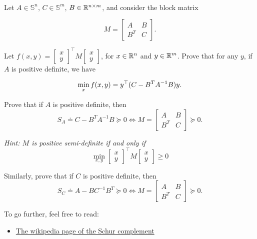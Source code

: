 \\ 
 Let $A \in \mathbb{S}^{n}$, $C \in \mathbb{S}^{m}$, $B \in \mathbb{R}^{n\times m}$, and consider the block matrix
 
 \[
 M = \begin{bmatrix}
A & B \\ 
B^T & C
\end{bmatrix}.
\]

\begin{enumerate}

\qitem Let $f(x, y) = \begin{bmatrix}
    x \\
    y
    \end{bmatrix}^\top M
    \begin{bmatrix}
    x \\
    y
    \end{bmatrix}$, for $x \in \mathbb{R}^{n}$ and $y \in \mathbb{R}^{m}$. Prove that for any $y$, if $A$ is positive definite, we have

\[
\min_x f(x, y) = y^{\top} (C- B^T A^{-1} B) y.
\]

\sol{}

\qitem Prove that if $A$ is positive definite, then 
\[
S_A \doteq C- B^T A^{-1} B \succeq 0 \Longleftrightarrow  M = \begin{bmatrix}
A & B \\ 
B^T & C
\end{bmatrix} \succeq 0.
\]

\textit{Hint: $M$ is positive semi-definite if and only if 
\[
\min_{x,y} \begin{bmatrix}
x \\
y
\end{bmatrix}^\top M 
\begin{bmatrix}
x \\
y
\end{bmatrix} \geq 0
\]
}

\sol{}
\qitem Similarly, prove that if $C$ is positive definite, then
\[
S_C \doteq A - B C^{-1} B^T \succeq 0 \Longleftrightarrow  M = \begin{bmatrix}
A & B \\ 
B^T & C
\end{bmatrix} \succeq 0.
\]

\sol{}

To go further, feel free to read:
\begin{itemize}
    \item \href{https://en.wikipedia.org/wiki/Schur_complement}{The wikipedia page of the Schur complement}
\end{itemize}


\end{enumerate}